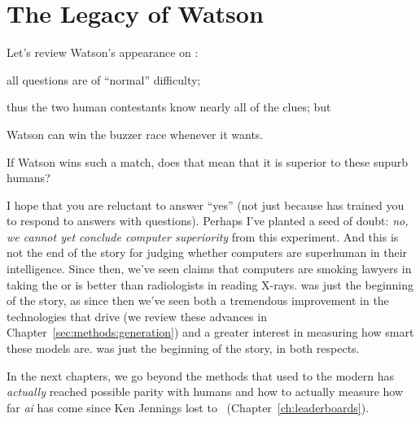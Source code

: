 
\section{The Legacy of Watson}


Let's review Watson's appearance on \jeopardy{}:
\begin{enumerate*}
        \item all questions are of ``normal'' difficulty;
        \item thus the two human contestants know nearly all of the clues; but
        \item Watson can win the buzzer race whenever it wants.
\end{enumerate*}
If Watson wins such a match, does that mean that it is superior to
these supurb humans?

I hope that you are reluctant to answer ``yes'' (not just
because \jeopardy{} has trained you to respond to answers with
questions).
%
Perhaps I've planted a seed of doubt: \emph{no, we cannot yet conclude
  computer superiority} from this experiment.
%
And this is not the end of the story for judging whether computers are
superhuman in their intelligence.
%
Since then, we've seen claims that computers are smoking lawyers in taking the
 or is better than radiologists in reading X-rays.
%
\watson{} was just the beginning of the story, as since then we've seen both a
tremendous improvement in the technologies that drive  (we review
these advances in Chapter~\ref{sec:methods:generation}) and a greater
interest in measuring how smart these models are.
%
\watson{} was just the beginning of the story, in both respects.


In the next chapters, we go beyond the methods that \watson{} used to the
modern  has \emph{actually} reached possible parity with humans and
how to actually measure how far \emph{ai} has come since Ken Jennings lost to
\watson{}\ (Chapter~\ref{ch:leaderboards}).
